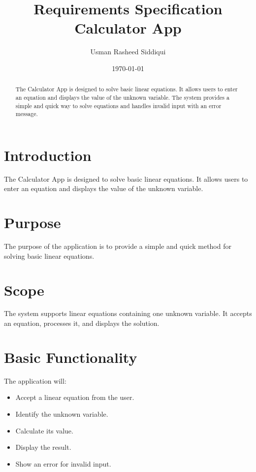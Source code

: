 \documentclass[12pt,a4paper]{article}
\title{Requirements Specification\\Calculator App}
\author{Usman Rasheed Siddiqui}
\date{\today}
\begin{document}
\maketitle

\begin{abstract}
The Calculator App is designed to solve basic linear equations.
It allows users to enter an equation and displays the value of
the unknown variable. The system provides a simple and quick way
to solve equations and handles invalid input with an error message.
\end{abstract}

\section{Introduction}

The Calculator App is designed to solve basic linear equations.
It allows users to enter an equation and displays the value of
the unknown variable.

\section{Purpose}

The purpose of the application is to provide a simple and quick
method for solving basic linear equations.

\section{Scope}

The system supports linear equations containing one unknown
variable. It accepts an equation, processes it, and displays
the solution.

\section{Basic Functionality}

The application will:

\begin{itemize}
    \item Accept a linear equation from the user.
    \item Identify the unknown variable.
    \item Calculate its value.
    \item Display the result.
    \item Show an error for invalid input.
\end{itemize}
\end{document}
